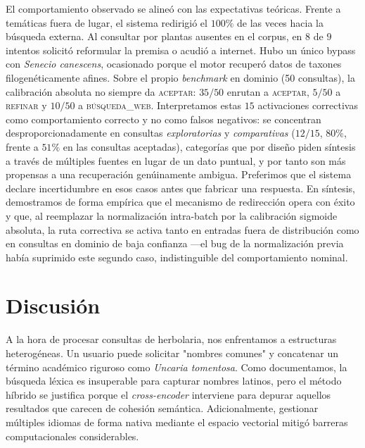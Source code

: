 \documentclass[runningheads]{llncs}
\begin{document}
El comportamiento observado se aline\'{o} con las expectativas te\'{o}ricas. Frente a tem\'{a}ticas fuera de lugar, el sistema redirigi\'{o} el $100\%$ de las veces hacia la b\'{u}squeda externa. Al consultar por plantas ausentes en el corpus, en $8$ de $9$ intentos solicit\'{o} reformular la premisa o acudi\'{o} a internet. Hubo un \'{u}nico bypass con \textit{Senecio canescens}, ocasionado porque el motor recuper\'{o} datos de taxones filogen\'{e}ticamente afines. Sobre el propio \emph{benchmark} en dominio (50 consultas), la calibraci\'{o}n absoluta no siempre da \textsc{aceptar}: $35/50$ enrutan a \textsc{aceptar}, $5/50$ a \textsc{refinar} y $10/50$ a \textsc{b\'{u}squeda\_web}. Interpretamos estas $15$ activaciones correctivas como comportamiento correcto y no como falsos negativos: se concentran desproporcionadamente en consultas \textit{exploratorias} y \textit{comparativas} ($12/15$, $80\%$, frente a $51\%$ en las consultas aceptadas), categor\'{i}as que por dise\~{n}o piden s\'{i}ntesis a trav\'{e}s de m\'{u}ltiples fuentes en lugar de un dato puntual, y por tanto son m\'{a}s propensas a una recuperaci\'{o}n gen\'{u}inamente ambigua. Preferimos que el sistema declare incertidumbre en esos casos antes que fabricar una respuesta. En s\'{i}ntesis, demostramos de forma emp\'{i}rica que el mecanismo de redirecci\'{o}n opera con \'{e}xito y que, al reemplazar la normalizaci\'{o}n intra-batch por la calibraci\'{o}n sigmoide absoluta, la ruta correctiva se activa tanto en entradas fuera de distribuci\'{o}n como en consultas en dominio de baja confianza —el bug de la normalizaci\'{o}n previa hab\'{i}a suprimido este segundo caso, indistinguible del comportamiento nominal.

\section{Discusi\'{o}n}
\label{sec:discussion}

A la hora de procesar consultas de herbolaria, nos enfrentamos a estructuras heterog\'{e}neas. Un usuario puede solicitar "nombres comunes" y concatenar un t\'{e}rmino acad\'{e}mico riguroso como \textit{Uncaria tomentosa}. Como documentamos, la b\'{u}squeda l\'{e}xica es insuperable para capturar nombres latinos, pero el m\'{e}todo h\'{i}brido se justifica porque el \emph{cross-encoder} interviene para depurar aquellos resultados que carecen de cohesi\'{o}n sem\'{a}ntica. Adicionalmente, gestionar m\'{u}ltiples idiomas de forma nativa mediante el espacio vectorial mitig\'{o} barreras computacionales considerables.
\end{document}

